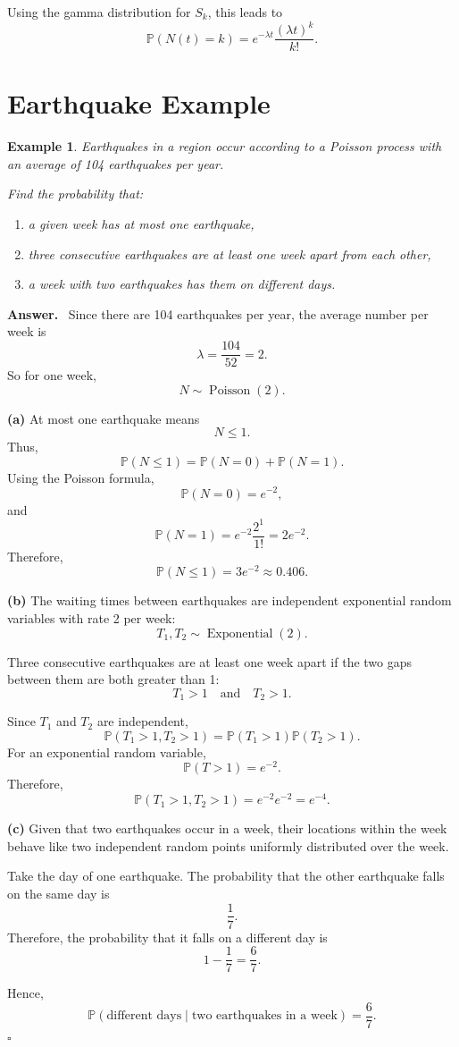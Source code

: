 \documentclass[12pt,a4paper]{article}
\theoremstyle{lecturestyle}
\newtheorem{example}{Example}
\newenvironment{answer}
{\par\textbf{Answer.}\ }
{\hfill$\square$\par}
\newcommand{\Prob}{\mathbb{P}}
\begin{document}
Using the gamma distribution for $S_k$, this leads to
\[
\Prob(N(t)=k)=e^{-\lambda t}\frac{(\lambda t)^k}{k!}.
\]

\section{Earthquake Example}

\begin{example}
Earthquakes in a region occur according to a Poisson process with an average of 104 earthquakes per year.

Find the probability that:
\begin{enumerate}[label=(\alph*)]
    \item a given week has at most one earthquake,
    \item three consecutive earthquakes are at least one week apart from each other,
    \item a week with two earthquakes has them on different days.
\end{enumerate}
\end{example}

\begin{answer}
Since there are 104 earthquakes per year, the average number per week is
\[
\lambda=\frac{104}{52}=2.
\]
So for one week,
\[
N\sim \operatorname{Poisson}(2).
\]

\textbf{(a)} At most one earthquake means
\[
N\leq 1.
\]
Thus,
\[
\Prob(N\leq 1)=\Prob(N=0)+\Prob(N=1).
\]
Using the Poisson formula,
\[
\Prob(N=0)=e^{-2},
\]
and
\[
\Prob(N=1)=e^{-2}\frac{2^1}{1!}=2e^{-2}.
\]
Therefore,
\[
\Prob(N\leq 1)=3e^{-2}\approx 0.406.
\]

\textbf{(b)} The waiting times between earthquakes are independent exponential random variables with rate 2 per week:
\[
T_1,T_2\sim \operatorname{Exponential}(2).
\]

Three consecutive earthquakes are at least one week apart if the two gaps between them are both greater than 1:
\[
T_1>1
\quad\text{and}\quad
T_2>1.
\]

Since $T_1$ and $T_2$ are independent,
\[
\Prob(T_1>1,T_2>1)
=
\Prob(T_1>1)\Prob(T_2>1).
\]
For an exponential random variable,
\[
\Prob(T>1)=e^{-2}.
\]
Therefore,
\[
\Prob(T_1>1,T_2>1)
=
e^{-2}e^{-2}
=
e^{-4}.
\]

\textbf{(c)} Given that two earthquakes occur in a week, their locations within the week behave like two independent random points uniformly distributed over the week.

Take the day of one earthquake. The probability that the other earthquake falls on the same day is
\[
\frac17.
\]
Therefore, the probability that it falls on a different day is
\[
1-\frac17=\frac67.
\]

Hence,
\[
\Prob(\text{different days}\mid \text{two earthquakes in a week})=\frac67.
\]
\end{answer}
\end{document}
